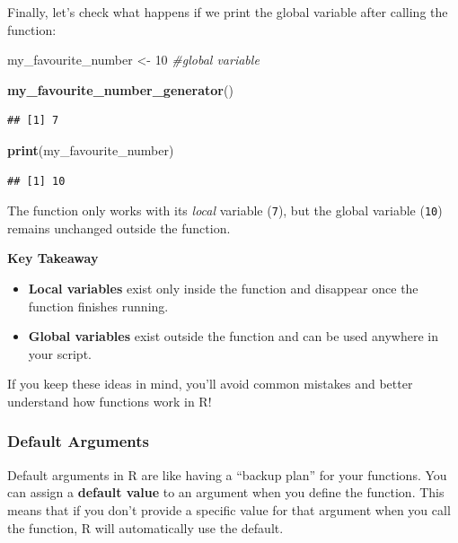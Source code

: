 \documentclass[
]{book}
\newenvironment{Shaded}{\begin{snugshade}}{\end{snugshade}}
\newcommand{\CommentTok}[1]{\textcolor[rgb]{0.56,0.35,0.01}{\textit{#1}}}
\newcommand{\DecValTok}[1]{\textcolor[rgb]{0.00,0.00,0.81}{#1}}
\newcommand{\FunctionTok}[1]{\textcolor[rgb]{0.13,0.29,0.53}{\textbf{#1}}}
\newcommand{\NormalTok}[1]{#1}
\newcommand{\OtherTok}[1]{\textcolor[rgb]{0.56,0.35,0.01}{#1}}
\begin{document}
Finally, let's check what happens if we print the global variable after calling the function:

\begin{Shaded}
\begin{Highlighting}[]
\NormalTok{my\_favourite\_number }\OtherTok{\textless{}{-}} \DecValTok{10} \CommentTok{\#global variable}

\FunctionTok{my\_favourite\_number\_generator}\NormalTok{()}
\end{Highlighting}
\end{Shaded}

\begin{verbatim}
## [1] 7
\end{verbatim}

\begin{Shaded}
\begin{Highlighting}[]
\FunctionTok{print}\NormalTok{(my\_favourite\_number)}
\end{Highlighting}
\end{Shaded}

\begin{verbatim}
## [1] 10
\end{verbatim}

The function only works with its \emph{local} variable (\texttt{7}), but the global variable (\texttt{10}) remains unchanged outside the function.

\textbf{Key Takeaway}

\begin{itemize}
\item
  \textbf{Local variables} exist only inside the function and disappear once the function finishes running.
\item
  \textbf{Global variables} exist outside the function and can be used anywhere in your script.
\end{itemize}

If you keep these ideas in mind, you'll avoid common mistakes and better understand how functions work in R!

\subsubsection{Default Arguments}\label{default-arguments}

Default arguments in R are like having a ``backup plan'' for your functions. You can assign a \textbf{default value} to an argument when you define the function. This means that if you don't provide a specific value for that argument when you call the function, R will automatically use the default.
\end{document}
